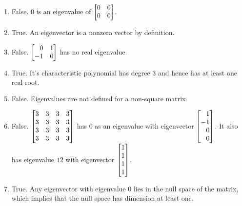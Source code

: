 \begin{exercises}
\begin{problist}
		\begin{solution}
            \begin{enumerate}
                \item False. $0$ is an eigenvalue of $\mat{0 & 0 \\ 0 & 0}$.
                \item True. An eigenvector is a nonzero vector by definition.
                \item False. $\mat{0 & 1 \\ -1 & 0}$ has no real eigenvalue.
                \item True. It's characteristic polynomial has degree $3$ and hence has at least one real root.
                \item False. Eigenvalues are not defined for a non-square matrix.
                \item False. $\mat{3 & 3 & 3 & 3 \\ 3 & 3 & 3 & 3\\3 & 3 & 3 & 3\\3 & 3 & 3 & 3}$ has $0$ as an eigenvalue with eigenvector $\mat{1 \\ -1 \\ 0 \\ 0}$. It also has eigenvalue $12$ with eigenvector $\mat{1 \\ 1 \\ 1 \\ 1}$. 
                \item True. Any eigenvector with eigenvalue $0$ lies in the null space of the matrix, which implies that the null space has dimension at least one.
            \end{enumerate}
		\end{solution}
		
	\end{problist}
\end{exercises}
